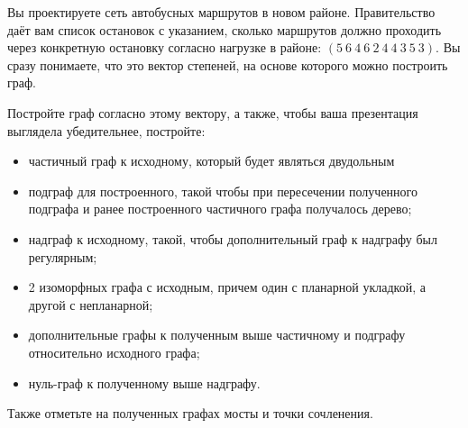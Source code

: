 \question
Вы проектируете сеть автобусных маршрутов в новом районе. Правительство даёт вам список остановок с указанием, сколько маршрутов должно проходить через конкретную остановку согласно нагрузке в районе: $(5\ 6\ 4\ 6\ 2\ 4\ 4\ 3\ 5\ 3)$. Вы сразу понимаете, что это вектор степеней, на основе которого можно построить граф.

Постройте граф согласно этому вектору, а также, чтобы ваша презентация выглядела убедительнее, постройте:

\begin{itemize}
\item частичный граф к исходному, который будет являться двудольным
\item подграф для построенного, такой чтобы при пересечении полученного подграфа и ранее построенного частичного графа получалось дерево;
\item надграф к исходному, такой, чтобы дополнительный граф к надграфу был регулярным;
\item 2 изоморфных графа с исходным, причем один с планарной укладкой, а другой с непланарной;
\item дополнительные графы к полученным выше частичному и подграфу относительно исходного графа;
\item нуль-граф к полученному выше надграфу.
\end{itemize}

Также отметьте на полученных графах мосты и точки сочленения.
